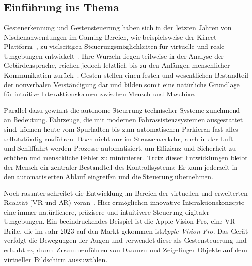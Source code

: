 \chapter{\chapOne}
\label{cha:chapter1} %

\begingroup
\fontsize{12pt}{14pt}\selectfont

\section{Einführung ins Thema}
Gestenerkennung und Gestensteuerung haben sich in den letzten Jahren von Nischenanwendungen im Gaming-Bereich, wie beispielsweise der Kinect-Plattform~\cite{Wiki:Kinect}, zu vielseitigen Steuerungsmöglichkeiten für virtuelle und reale Umgebungen entwickelt~\cite{RG:GestureRecognition}.
Ihre Wurzeln liegen teilweise in der Analyse der Gebärdensprache, reichen jedoch letztlich bis zu den Anfängen menschlicher Kommunikation zurück~\cite{Wiki:Gestenerkennung}\cite{RG:Gesten}.
Gesten stellen einen festen und wesentlichen Bestandteil der nonverbalen Verständigung dar und bilden somit eine natürliche Grundlage für intuitive Interaktionsformen zwischen Mensch und Maschine.~\cite[10]{Hobmair:Psy}

Parallel dazu gewinnt die autonome Steuerung technischer Systeme zunehmend an Bedeutung.
Fahrzeuge, die mit modernen Fahrassistenzsystemen ausgestattet sind, können heute vom Spurhalten bis zum automatischen Parkieren fast alles selbstständig ausführen.
Doch nicht nur im Strassenverkehr, auch in der Luft- und Schifffahrt werden Prozesse automatisiert, um Effizienz und Sicherheit zu erhöhen und menschliche Fehler zu minimieren.
Trotz dieser Entwicklungen bleibt der Mensch ein zentraler Bestandteil des Kontrollsystems: Er kann jederzeit in den automatisierten Ablauf eingreifen und die Steuerung übernehmen.~\cite{Wiki:aupi}

Noch rasanter schreitet die Entwicklung im Bereich der virtuellen und erweiterten Realität (VR und AR) voran~\cite{SD:VR}.
Hier ermöglichen innovative Interaktionskonzepte eine immer natürlichere, präzisere und intuitivere Steuerung digitaler Umgebungen.
Ein beeindruckendes Beispiel ist die Apple Vision Pro, eine VR-Brille, die im Jahr 2023 auf den Markt gekommen ist\textit{Apple Vision Pro}.
Das Gerät verfolgt die Bewegungen der Augen und verwendet diese als Gestensteuerung und erlaubt es, durch Zusammenführen von Daumen und Zeigefinger Objekte auf dem virtuellen Bildschirm auszuwählen.~\cite{apl:vision}

